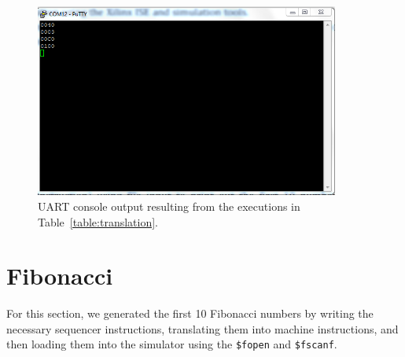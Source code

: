 \documentclass[]{article}
\begin{document}
\begin{figure}[H]
\centering
\includegraphics[width=10cm]{translation.PNG}
\caption{UART console output resulting from the executions in Table~\ref{table:translation}.}
\end{figure}

\section{Fibonacci}

For this section, we generated the first 10 Fibonacci numbers by writing the necessary sequencer instructions, translating them into machine instructions, and then loading them into the simulator using the \texttt{\$fopen} and \texttt{\$fscanf}.
\end{document}
